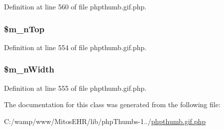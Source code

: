 \-Definition at line 560 of file phpthumb.\-gif.\-php.

\hypertarget{class_c_g_i_f_i_m_a_g_e_h_e_a_d_e_r_a4c15c4753f28e0cc43d7f456ee54016d}{
\subsubsection[{\$m\-\_\-n\-Top}]{\setlength{\rightskip}{0pt plus 5cm}\$m\-\_\-n\-Top}}\label{class_c_g_i_f_i_m_a_g_e_h_e_a_d_e_r_a4c15c4753f28e0cc43d7f456ee54016d}


\-Definition at line 554 of file phpthumb.\-gif.\-php.

\hypertarget{class_c_g_i_f_i_m_a_g_e_h_e_a_d_e_r_ad30af53763e84b5b9bec01595ccf9598}{
\subsubsection[{\$m\-\_\-n\-Width}]{\setlength{\rightskip}{0pt plus 5cm}\$m\-\_\-n\-Width}}\label{class_c_g_i_f_i_m_a_g_e_h_e_a_d_e_r_ad30af53763e84b5b9bec01595ccf9598}


\-Definition at line 555 of file phpthumb.\-gif.\-php.



\-The documentation for this class was generated from the following file\-:\begin{DoxyCompactItemize}
\item 
\-C\-:/wamp/www/\-Mitos\-E\-H\-R/lib/php\-Thumbs-\/1../\hyperlink{phpthumb_8gif_8php}{phpthumb.\-gif.\-php}\end{DoxyCompactItemize}
